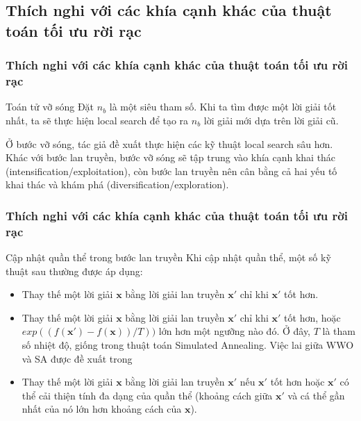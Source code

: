 \subsection{Thích nghi với các khía cạnh khác của thuật toán tối ưu rời rạc}
\begin{frame}
    \frametitle{Thích nghi với các khía cạnh khác của thuật toán tối ưu rời rạc}
    \begin{block}{Toán tử vỡ sóng}
        Đặt $n_b$ là một siêu tham số. Khi ta tìm được một lời giải tốt nhất, ta sẽ thực hiện local search để tạo ra $n_b$ lời giải mới dựa trên lời giải cũ.

        Ở bước vỡ sóng, tác giả đề xuất thực hiện các kỹ thuật local search sâu hơn. Khác với bước lan truyền, bước vỡ sóng sẽ tập trung vào khía cạnh khai thác (intensification/exploitation), còn bước lan truyền nên cân bằng cả hai yếu tố khai thác và khám phá (diversification/exploration).
    \end{block}
\end{frame}


\begin{frame}
    \frametitle{Thích nghi với các khía cạnh khác của thuật toán tối ưu rời rạc}
    \begin{block}{Cập nhật quần thể trong bước lan truyền}
        Khi cập nhật quần thể, một số kỹ thuật sau thường được áp dụng:
        \begin{itemize}
            \item Thay thế một lời giải $\mathbf{x}$ bằng lời giải lan truyền $\mathbf{x'}$ chỉ khi $\mathbf{x'}$ tốt hơn.
            \item Thay thế một lời giải $\mathbf{x}$ bằng lời giải lan truyền $\mathbf{x'}$ chỉ khi $\mathbf{x'}$ tốt hơn, hoặc $exp((f(\mathbf{x'}) - f(\mathbf{x}))/T))$ lớn hơn một ngưỡng nào đó. Ở đây, $T$ là tham số nhiệt độ, giống trong thuật toán Simulated Annealing. Việc lai giữa WWO và SA được đề xuất trong \cite{wang2017adaptive}
            \item Thay thế một lời giải $\mathbf{x}$ bằng lời giải lan truyền $\mathbf{x'}$ nếu $\mathbf{x'}$ tốt hơn hoặc $\mathbf{x'}$ có thể cải thiện tính đa dạng của quần thể (khoảng cách giữa $\mathbf{x'}$ và cá thể gần nhất của nó lớn hơn khoảng cách của $\mathbf{x}$).
        \end{itemize}
    \end{block}
\end{frame}